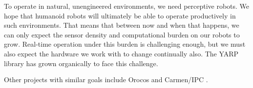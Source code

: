 
To operate in natural, unengineered environments, we need perceptive
robots.  We hope that humanoid robots will ultimately be able to
operate productively in such environments.  That means that between
now and when that happens, we can only expect the sensor density and
computational burden on our robots to grow.  Real-time operation under
this burden is challenging enough, but we must also expect the
hardware we work with to change continually also.  The YARP library
has grown organically to face this challenge.


Other projects with similar goals include
Orocos \cite{soetens05orocos} and
Carmen/IPC \cite{roy03IROS}.

